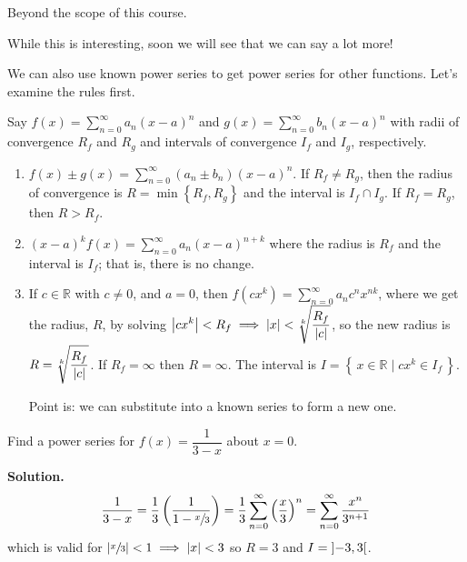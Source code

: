 \begin{Proof}{}{}
    Beyond the scope of this course.
\end{Proof}

While this is interesting, soon we will see that we can say a lot more!

We can also use known power series to get power series for other functions. Let's
examine the rules first.

Say $ f(x)=\sum\limits_{n=0}^{\infty} a_n(x-a)^n $ and $ g(x)=\sum\limits_{n=0}^{\infty} b_n(x-a)^n $
with radii of convergence $ R_f $ and $ R_g $ and intervals of convergence
$ I_f $ and $ I_g $, respectively.

\begin{enumerate}
    \item $ f(x)\pm g(x)=\sum\limits_{n=0}^{\infty} (a_n\pm b_n)(x-a)^n $. If $ R_f\neq R_g $,
          then the radius of convergence is $ R=\min\left\{ R_f,R_g\right\} $
          and the interval is $ I_f\cap I_g $. If $ R_f=R_g $, then $ R>R_f $.
    \item $ (x-a)^k f(x)=\sum\limits_{n=0}^{\infty} a_n(x-a)^{n+k} $ where the radius
          is $ R_f $ and the interval is $ I_f $; that is, there is no change.
    \item If $ c\in\mathbb{R} $ with $ c\neq 0 $, and $ a=0 $,
          then $ f(cx^k)=\sum\limits_{n=0}^{\infty} a_n c^n x^{nk} $, where we get the radius,
          $ R $, by solving $
              \displaystyle \abs*{cx^k}<R_f\implies \abs{x}<\sqrt[k]{\frac{R_f}{\abs{c}}} $,
          so the new radius is
          $ \displaystyle R=\sqrt[k]{\dfrac{R_f}{\abs{c}}} $. If $ R_f=\infty $
          then $ R=\infty $. The interval is $ I=\left\{\,x\in\mathbb{R}\mid cx^k\in I_f\,\right\} $.

          Point is: we can substitute into a known series to form a new one.
\end{enumerate}

\begin{Example}{}{}
    Find a power series for $ f(x)=\dfrac{1}{3-x} $ about $ x=0 $.

    \textbf{Solution.}
    \[ \frac{1}{3-x}
        =\frac{1}{3} \left( \frac{1}{1-\sfrac{x}{3}}  \right)
        =\frac{1}{3}\sum\limits_{n=0}^{\infty} \left( \frac{x}{3} \right)^n
        =\sum\limits_{n=0}^{\infty} \frac{x^n}{3^{n+1}}  \]
    which is valid for $ \abs*{\sfrac{x}{3}}<1\implies \abs{x}<3 $ so $ R=3 $
    and $ I=\interval[open]{-3}{3} $.
\end{Example}

